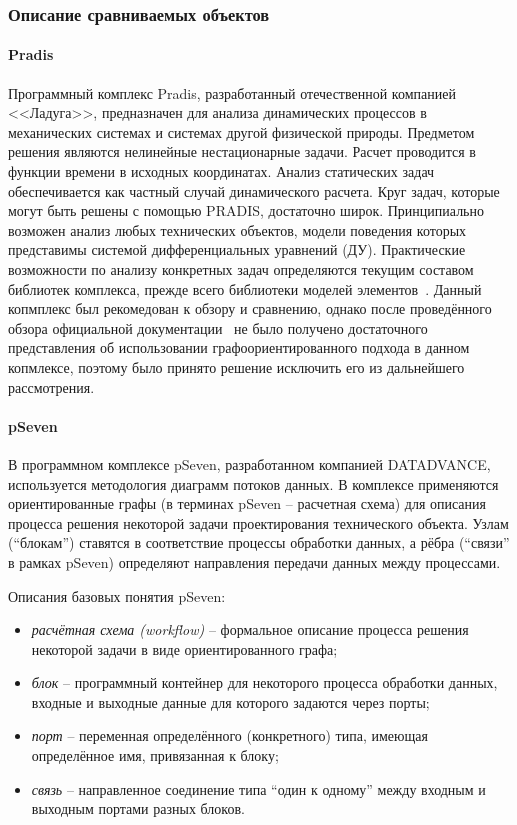 \subsubsection{Описание сравниваемых объектов}

\paragraph{Pradis}

Программный комплекс Pradis, разработанный отечественной компанией <<Ладуга>>, предназначен для анализа динамических процессов в механических системах и системах другой физической природы. Предметом решения являются  нелинейные нестационарные задачи. Расчет проводится в функции времени в исходных координатах. Анализ статических задач обеспечивается как частный случай динамического расчета. Круг задач, которые могут быть решены с помощью PRADIS, достаточно широк. Принципиально возможен анализ любых технических объектов, модели поведения которых представимы системой дифференциальных уравнений (ДУ). Практические возможности по анализу конкретных задач определяются текущим составом библиотек комплекса, прежде всего библиотеки моделей элементов~\cite{PradisGeneral2007}. Данный копмплекс был рекомедован к обзору и сравнению, однако после проведённого обзора официальной документации~\cite{PradisMethods2007} не было получено достаточного представления об использовании графоориентированного подхода в данном копмлексе, поэтому было принято решение исключить его из дальнейшего рассмотрения.

\paragraph{pSeven}

В программном комплексе pSeven, разработанном компанией DATADVANCE, используется методология диаграмм потоков данных. В комплексе применяются ориентированные графы (в терминах pSeven -- расчетная схема) для описания процесса решения некоторой задачи проектирования технического объекта. Узлам (``блокам'') ставятся в соответствие процессы обработки данных, а рёбра (``связи'' в рамках pSeven) определяют направления передачи данных между процессами. 

Описания базовых понятия pSeven:
\begin{itemize}
    \item \emph{расчётная схема (workflow)} -- формальное описание процесса решения некоторой задачи в виде ориентированного графа;
    \item \emph{блок} -- программный контейнер для некоторого процесса обработки данных, входные и выходные данные для которого задаются через порты;
    \item \emph{порт} -- переменная определённого (конкретного) типа, имеющая определённое имя, привязанная к блоку;
    \item \emph{связь} -- направленное соединение типа ``один к одному'' между входным и выходным портами разных блоков.
\end{itemize}

